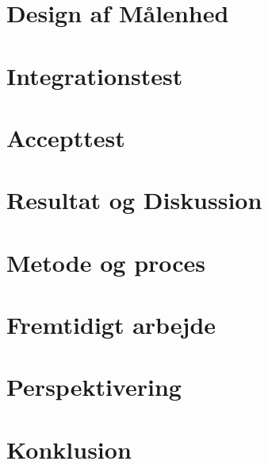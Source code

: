 \documentclass[a4paper, 11pt,oneside,openany, danish]{memoir} %
\begin{document}
\chapter{Design af Målenhed}
\chapter{Integrationstest}
\chapter{Accepttest}
\chapter{Resultat og Diskussion}
\chapter{Metode og proces}
\chapter{Fremtidigt arbejde}

\chapter{Perspektivering}
\chapter{Konklusion}

\mainmatter



\printbibliography
\end{document}
